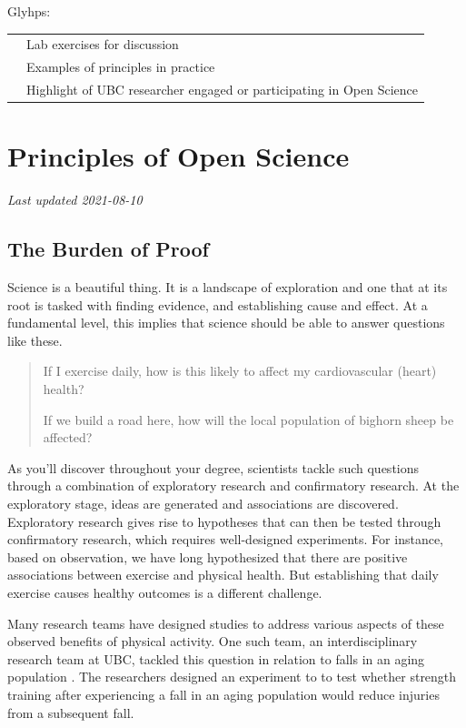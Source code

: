 \documentclass[
]{book}
\begin{document}
Glyhps:

\begin{longtable}[]{@{}ll@{}}
\toprule
& \\
\midrule
\endhead
& Lab exercises for discussion \\
& Examples of principles in practice \\
& Highlight of UBC researcher engaged or participating in Open Science \\
\bottomrule
\end{longtable}

\hypertarget{principles-of-open-science}{%
\chapter{Principles of Open Science}\label{principles-of-open-science}}

\emph{Last updated 2021-08-10}

\hypertarget{the-burden-of-proof}{%
\section{The Burden of Proof}\label{the-burden-of-proof}}

Science is a beautiful thing. It is a landscape of exploration and one that at its root is tasked with finding evidence, and establishing cause and effect. At a fundamental level, this implies that science should be able to answer questions like these.

\begin{quote}
If I exercise daily, how is this likely to affect my cardiovascular (heart) health?

If we build a road here, how will the local population of bighorn sheep be affected?
\end{quote}

As you'll discover throughout your degree, scientists tackle such questions through a combination of exploratory research and confirmatory research. At the exploratory stage, ideas are generated and associations are discovered. Exploratory research gives rise to hypotheses that can then be tested through confirmatory research, which requires well-designed experiments. For instance, based on observation, we have long hypothesized that there are positive associations between exercise and physical health. But establishing that daily exercise causes healthy outcomes is a different challenge.

Many research teams have designed studies to address various aspects of these observed benefits of physical activity. One such team, an interdisciplinary research team at UBC, tackled this question in relation to falls in an aging population \citep{liu-ambrose_effect_2019}. The researchers designed an experiment to to test whether strength training after experiencing a fall in an aging population would reduce injuries from a subsequent fall.
\end{document}
